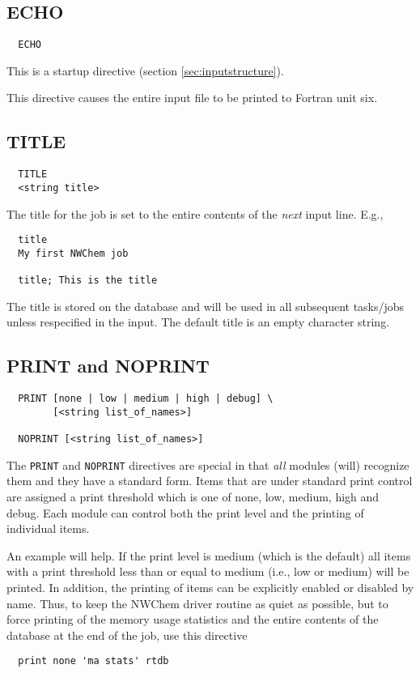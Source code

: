\subsection{ECHO}

\begin{verbatim}
  ECHO
\end{verbatim}

This is a startup directive (section \ref{sec:inputstructure}).

This directive causes the entire input file to be printed to Fortran
unit six.

\subsection{TITLE}

\begin{verbatim}
  TITLE 
  <string title>
\end{verbatim}

  The title for the job is set to the entire contents of the {\em
next} input line.  E.g.,
\begin{verbatim}
  title
  My first NWChem job

  title; This is the title
\end{verbatim}
The title is stored on the database and will be used in all subsequent
tasks/jobs unless respecified in the input.  The default title is an
empty character string.

\subsection{PRINT and NOPRINT}
\label{sec:printcontrol}

\begin{verbatim}
  PRINT [none | low | medium | high | debug] \
        [<string list_of_names>]

  NOPRINT [<string list_of_names>]
\end{verbatim}

The \verb+PRINT+ and \verb+NOPRINT+ directives are special in that
{\em all} modules (will) recognize them and they  have a
standard form.  Items that are under standard print control are
assigned a print threshold which is one of none, low, medium, high and
debug.  Each module can control both the print level and the printing
of individual items.

An example will help.  If the print level is medium (which is the
default) all items with a print threshold less than or equal to medium
(i.e., low or medium) will be printed.  In addition, the printing of
items can be explicitly enabled or disabled by name.  Thus, to keep
the NWChem driver routine as quiet as possible, but to force printing
of the memory usage statistics and the entire contents of the database
at the end of the job, use this directive
\begin{verbatim}
  print none 'ma stats' rtdb
\end{verbatim}

